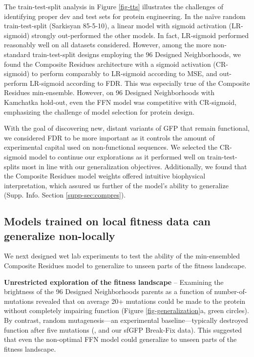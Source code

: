 The train-test-split analysis in Figure \ref{fig-tts} illustrates the challenges of identifying proper dev and test sets for protein engineering. In the na\"ive random train-test-split (Sarkisyan 85-5-10), a linear model with sigmoid activation (LR-sigmoid) strongly out-performed the other models. In fact, LR-sigmoid performed reasonably well on all datasets considered. However, among the more non-standard train-test-split designs employing the 96 Designed Neighborhoods, we found the Composite Residues architecture with a sigmoid activation (CR-sigmoid) to perform comparably to LR-sigmoid according to MSE, and out-perform LR-sigmoid according to FDR. This was especially true of the Composite Residues min-ensemble. However, on 96 Designed Neighborhoods with Kamchatka hold-out, even the FFN model was competitive with CR-sigmoid, emphasizing the challenge of model selection for protein design. 

With the goal of discovering new, distant variants of GFP that remain functional, we considered FDR to be more important as it controls the amount of experimental capital used on non-functional sequences. We selected the CR-sigmoid model to continue our explorations as it performed well on train-test-splits most in line with our generalization objectives. Additionally, we found that the Composite Residues model weights offered intuitive biophysical interpretation, which assured us further of the model's ability to generalize (Supp. Info. Section \ref{supp-sec:compres}).

\subsection{Models trained on local fitness data can generalize non-locally}

We next designed wet lab experiments to test the ability of the min-ensembled Composite Residues model to generalize to unseen parts of the fitness landscape.

\textbf{Unrestricted exploration of the fitness landscape} --
Examining the brightness of the 96 Designed Neighborhoods parents as a function of number-of-mutations revealed that on average 20+ mutations could be made to the protein without completely impairing function (Figure \ref{fig-generalization}a, green circles). By contrast, random mutagenesis---an experimental baseline---typically destroyed function after five mutations (\cite{Sarkisyan2016-cr}, and our sfGFP Break-Fix data). This suggested that even the non-optimal FFN model could generalize to unseen parts of the fitness landscape.

